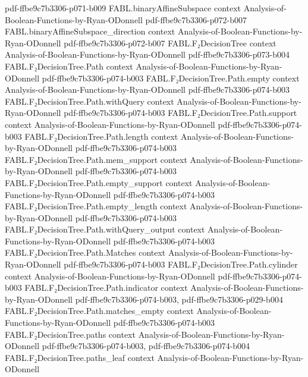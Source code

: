 \begin{theorem}
  {pdf-ffbe9c7b3306-p071-b009}
\proofstep
  {FABL.binaryAffineSubspace}
  {context}
  {Analysis-of-Boolean-Functions-by-Ryan-ODonnell}
  {pdf-ffbe9c7b3306-p072-b007}
\proofstep
  {FABL.binaryAffineSubspace_direction}
  {context}
  {Analysis-of-Boolean-Functions-by-Ryan-ODonnell}
  {pdf-ffbe9c7b3306-p072-b007}
\proofstep
  {FABL.F₂DecisionTree}
  {context}
  {Analysis-of-Boolean-Functions-by-Ryan-ODonnell}
  {pdf-ffbe9c7b3306-p073-b004}
\proofstep
  {FABL.F₂DecisionTree.Path}
  {context}
  {Analysis-of-Boolean-Functions-by-Ryan-ODonnell}
  {pdf-ffbe9c7b3306-p074-b003}
\proofstep
  {FABL.F₂DecisionTree.Path.empty}
  {context}
  {Analysis-of-Boolean-Functions-by-Ryan-ODonnell}
  {pdf-ffbe9c7b3306-p074-b003}
\proofstep
  {FABL.F₂DecisionTree.Path.withQuery}
  {context}
  {Analysis-of-Boolean-Functions-by-Ryan-ODonnell}
  {pdf-ffbe9c7b3306-p074-b003}
\proofstep
  {FABL.F₂DecisionTree.Path.support}
  {context}
  {Analysis-of-Boolean-Functions-by-Ryan-ODonnell}
  {pdf-ffbe9c7b3306-p074-b003}
\proofstep
  {FABL.F₂DecisionTree.Path.length}
  {context}
  {Analysis-of-Boolean-Functions-by-Ryan-ODonnell}
  {pdf-ffbe9c7b3306-p074-b003}
\proofstep
  {FABL.F₂DecisionTree.Path.mem_support}
  {context}
  {Analysis-of-Boolean-Functions-by-Ryan-ODonnell}
  {pdf-ffbe9c7b3306-p074-b003}
\proofstep
  {FABL.F₂DecisionTree.Path.empty_support}
  {context}
  {Analysis-of-Boolean-Functions-by-Ryan-ODonnell}
  {pdf-ffbe9c7b3306-p074-b003}
\proofstep
  {FABL.F₂DecisionTree.Path.empty_length}
  {context}
  {Analysis-of-Boolean-Functions-by-Ryan-ODonnell}
  {pdf-ffbe9c7b3306-p074-b003}
\proofstep
  {FABL.F₂DecisionTree.Path.withQuery_output}
  {context}
  {Analysis-of-Boolean-Functions-by-Ryan-ODonnell}
  {pdf-ffbe9c7b3306-p074-b003}
\proofstep
  {FABL.F₂DecisionTree.Path.Matches}
  {context}
  {Analysis-of-Boolean-Functions-by-Ryan-ODonnell}
  {pdf-ffbe9c7b3306-p074-b003}
\proofstep
  {FABL.F₂DecisionTree.Path.cylinder}
  {context}
  {Analysis-of-Boolean-Functions-by-Ryan-ODonnell}
  {pdf-ffbe9c7b3306-p074-b003}
\proofstep
  {FABL.F₂DecisionTree.Path.indicator}
  {context}
  {Analysis-of-Boolean-Functions-by-Ryan-ODonnell}
  {pdf-ffbe9c7b3306-p074-b003,
    pdf-ffbe9c7b3306-p029-b004}
\proofstep
  {FABL.F₂DecisionTree.Path.matches_empty}
  {context}
  {Analysis-of-Boolean-Functions-by-Ryan-ODonnell}
  {pdf-ffbe9c7b3306-p074-b003}
\proofstep
  {FABL.F₂DecisionTree.paths}
  {context}
  {Analysis-of-Boolean-Functions-by-Ryan-ODonnell}
  {pdf-ffbe9c7b3306-p074-b003,
    pdf-ffbe9c7b3306-p074-b004}
\proofstep
  {FABL.F₂DecisionTree.paths_leaf}
  {context}
  {Analysis-of-Boolean-Functions-by-Ryan-ODonnell}

\end{theorem}
